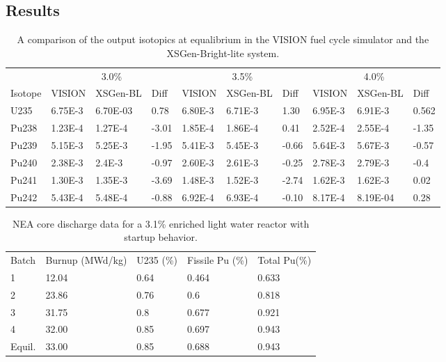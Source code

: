 \documentclass{article}
\begin{document}
\subsection{Results}
\begin{table}[]
\centering
\caption{A comparison of the output isotopics at equalibrium in the VISION fuel cycle simulator and the XSGen-Bright-lite system.}
\label{Table 1}
\begin{tabular}{llllllllll}
 & \multicolumn{3}{c}{3.0\%} & \multicolumn{3}{c}{3.5\%} & \multicolumn{3}{c}{4.0\%} \\
Isotope & VISION & XSGen-BL & Diff & VISION & XSGen-BL & Diff & VISION & XSGen-BL & Diff \\
U235 & 6.75E-3 & 6.70E-03 & 0.78 & 6.80E-3 & 6.71E-3 & 1.30 & 6.95E-3 & 6.91E-3 & 0.562 \\
Pu238 & 1.23E-4 & 1.27E-4 & -3.01 & 1.85E-4 & 1.86E-4 & 0.41 & 2.52E-4 & 2.55E-4 & -1.35 \\
Pu239 & 5.15E-3 & 5.25E-3 & -1.95 & 5.41E-3 & 5.45E-3 & -0.66 & 5.64E-3 & 5.67E-3 & -0.57 \\
Pu240 & 2.38E-3 & 2.4E-3 & -0.97 & 2.60E-3 & 2.61E-3 & -0.25 & 2.78E-3 & 2.79E-3 & -0.4 \\
Pu241 & 1.30E-3 & 1.35E-3 & -3.69 & 1.48E-3 & 1.52E-3 & -2.74 & 1.62E-3 & 1.62E-3 & 0.02 \\
Pu242 & 5.43E-4 & 5.48E-4 & -0.88 & 6.92E-4 & 6.93E-4 & -0.10 & 8.17E-4 & 8.19E-04 & 0.28
\end{tabular}
\end{table}

\begin{table}[]
\centering
\caption{NEA core discharge data for a 3.1\% enriched light water reactor with startup behavior.}
\label{Table 2}
\begin{tabular}{lllll}
Batch & Burnup (MWd/kg) & U235 (\%) & Fissile Pu (\%) & Total Pu(\%) \\
1 & 12.04 & 0.64 & 0.464 & 0.633 \\
2 & 23.86 & 0.76 & 0.6 & 0.818 \\
3 & 31.75 & 0.8 & 0.677 & 0.921 \\
4 & 32.00 & 0.85 & 0.697 & 0.943 \\
Equil. & 33.00 & 0.85 & 0.688 & 0.943
\end{tabular}
\end{table}
\end{document}
